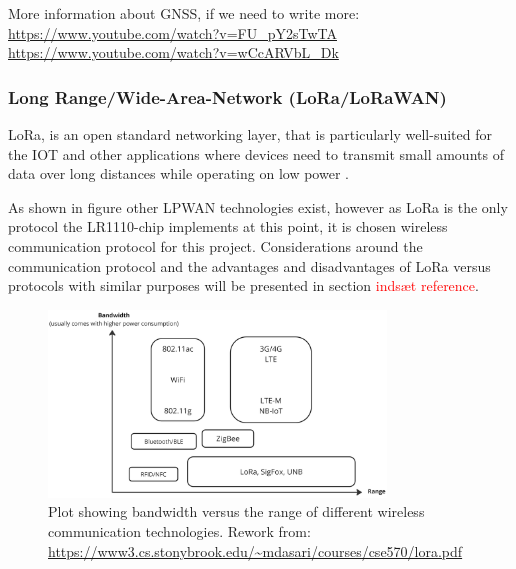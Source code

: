 More information about GNSS, if we need to write more:
\url{https://www.youtube.com/watch?v=FU_pY2sTwTA}
\url{https://www.youtube.com/watch?v=wCcARVbL_Dk}


\subsubsection{Long Range/Wide-Area-Network (LoRa/LoRaWAN)}
\ac{LoRa}, is an open standard networking layer, that is particularly well-suited for the \ac{IOT} and other applications where devices need to transmit small amounts of data over long distances while operating on low power \cite{LoRaWAN_1_0}.

As shown in figure  other \ac{LPWAN} technologies exist, however as \ac{LoRa} is the only protocol the LR1110-chip implements at this point, it is chosen wireless communication protocol for this project.
Considerations around the communication protocol and the advantages and disadvantages of \ac{LoRa} versus protocols with similar purposes will be presented in section \textcolor{red}{indsæt reference}.

\begin{figure}[H]
    \centering
    \includegraphics[width=0.8\textwidth]{figures/range_bandwidth.png}
    \caption{Plot showing bandwidth versus the range of different wireless communication technologies. Rework from: \url{https://www3.cs.stonybrook.edu/~mdasari/courses/cse570/lora.pdf}}
    \label{fig:LoRa_bandwidth_range}
\end{figure}

